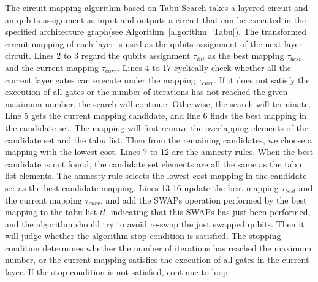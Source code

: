 \documentclass[runningheads]{llncs}
\begin{document}
	The circuit mapping algorithm based on Tabu Search takes a layered circuit and an qubits assignment as input and outputs a circuit that can be executed in the specified architecture graph(see Algorithm~\ref{algorithm_Tabu}). The transformed circuit mapping of each layer is used as the qubits assignment of the next layer circuit. Lines 2 to 3 regard the qubits assignment $\tau_{ini}$ as the best mapping $\tau_{best}$ and the current mapping $\tau_{curr}$. Lines 4 to 17 cyclically check whether all the current layer gates can execute under the mapping $\tau_{curr}$. If it does not satisfy the execution of all gates or the number of iterations has not reached the given maximum number, the search will continue. Otherwise, the search will terminate. Line 5  gets the current mapping candidate, and line 6 finds the best mapping in the candidate set. The mapping will first remove the overlapping elements of the candidate set and the tabu list. Then from the remaining candidates, we choose a mapping with the lowest cost. Lines 7 to 12 are the amnesty rules. When the best candidate is not found, the candidate set elements are all the same as the tabu list elements. The amnesty rule selects the lowest cost mapping in the candidate set as the best candidate mapping. Lines 13-16 update the best mapping $\tau_{best}$ and the current mapping $\tau_{curr}$, and add the SWAPs operation performed by the best mapping to the tabu list $tl$, indicating that this SWAPs has just been performed, and the algorithm should try to avoid re-swap the just swapped qubits. Then it will judge whether the algorithm stop condition is satisfied. The stopping condition determines whether the number of iterations has reached the maximum number, or the current mapping satisfies the execution of all gates in the current layer. If the stop condition is not satisfied, continue to loop.
\end{document}

